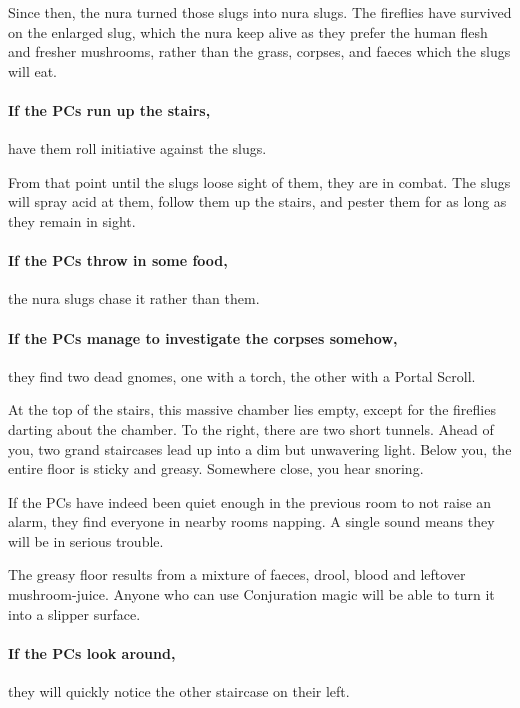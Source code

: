 \begin{multicols}{2}
Since then, the nura turned those slugs into nura slugs.
The fireflies have survived on the enlarged slug, which the nura keep alive as they prefer the human flesh and fresher mushrooms, rather than the grass, corpses, and faeces which the slugs will eat.

\paragraph{If the PCs run up the stairs,}
have them roll initiative against the slugs.

From that point until the slugs loose sight of them, they are in combat.
The slugs will spray acid at them, follow them up the stairs, and pester them for as long as they remain in sight.

\paragraph{If the PCs throw in some food,}
the nura slugs chase it rather than them.

\paragraph{If the PCs manage to investigate the corpses somehow,}
they find two dead gnomes, one with a torch, the other with a Portal Scroll.



\begin{boxtext}

	At the top of the stairs, this massive chamber lies empty, except for the fireflies darting about the chamber.
	To the right, there are two short tunnels.
	Ahead of you, two grand staircases lead up into a dim but unwavering light.
	Below you, the entire floor is sticky and greasy.
	Somewhere close, you hear snoring.

\end{boxtext}

If the PCs have indeed been quiet enough in the previous room to not raise an alarm, they find everyone in nearby rooms napping.
A single sound means they will be in serious trouble.

The greasy floor results from a mixture of faeces, drool, blood and leftover mushroom-juice.
Anyone who can use Conjuration magic will be able to turn it into a slipper surface.

\paragraph{If the PCs look around,}
they will quickly notice the other staircase on their left.


\end{multicols}
